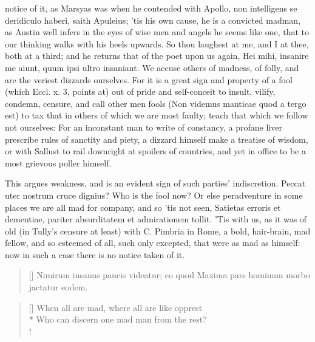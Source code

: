 {notice of it, as Marsyas was when he contended with Apollo, non
intelligens se deridiculo haberi, saith  Apuleius; 'tis his own
cause, he is a convicted madman, as Austin well infers in the eyes
of wise men and angels he seems like one, that to our thinking walks
with his heels upwards. So thou laughest at me, and I at thee, both at
a third; and he returns that of the poet upon us again, Hei mihi,
insanire me aiunt, quum ipsi ultro insaniant. We accuse others of
madness, of folly, and are the veriest dizzards ourselves. For it is a
great sign and property of a fool (which Eccl. x. 3, points at) out of
pride and self-conceit to insult, vilify, condemn, censure, and call
other men fools (Non videmus manticae quod a tergo est) to tax that in
others of which we are most faulty; teach that which we follow not
ourselves: For an inconstant man to write of constancy, a profane liver
prescribe rules of sanctity and piety, a dizzard himself make a
treatise of wisdom, or with Sallust to rail downright at spoilers of
countries, and yet in office to be a most grievous poller himself.

This argues weakness, and is an evident sign of such parties'
indiscretion. Peccat uter nostrum cruce dignius? Who is the fool
now? Or else peradventure in some places we are all mad for company,
and so 'tis not seen, Satietas erroris et dementiae, pariter
absurditatem et admirationem tollit. 'Tis with us, as it was of old (in
Tully's censure at least) with C. Pimbria in Rome, a bold,
hair-brain, mad fellow, and so esteemed of all, such only excepted,
that were as mad as himself: now in such a case there is no notice
taken of it.

\settowidth{\versewidth}{Maxima pars hominum morbo jactatur eodem.}
\begin{verse}[\versewidth]
Nimirum insanus paucis videatur; eo quod
Maxima pars hominum morbo jactatur eodem.
\end{verse}

\settowidth{\versewidth}{When all are mad, where all are like opprest}
\begin{verse}[\versewidth]
When all are mad, where all are like opprest\\*
Who can discern one mad man from the rest?\\!
\end{verse}

}
